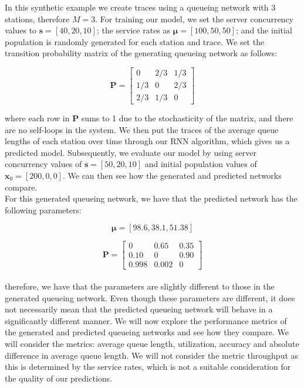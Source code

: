 \documentclass[a4paper,11pt,titlepage]{article}
\begin{document}
In this synthetic example we create traces using a queueing network with 3 stations, therefore $M=3$. For training our model, we set the server concurrency values to $\mathbf{s} = [40, 20, 10]$; the service rates as $\bm{\mu} = [100,50,50]$; and the initial population is randomly generated for each station and trace. We set the transition probability matrix of the generating queueing network as follows: 

\begin{equation}
    \mathbf{P} = \begin{bmatrix}
     0 & 2/3 & 1/3 \\
     1/3 & 0 & 2/3 \\
     2/3 & 1/3 & 0
    \end{bmatrix}
\end{equation}

where each row in $\mathbf{P}$ sums to 1 due to the stochasticity of the matrix, and there are no self-loops in the system. We then put the traces of the average queue lengths of each station over time through our RNN algorithm, which gives us a predicted model. Subsequently, we evaluate our model by using server concurrency values of $\mathbf{s} = [50, 20,  10]$ and initial population values of $ \mathbf{x}_0 = [200,0,0]$. We can then see how the generated and predicted networks compare. \\

For this generated queueing network, we have that the predicted network has the following parameters: 

$$ \bm{\mu} = [98.6, 38.1, 51.38] $$

$$\mathbf{P} = \begin{bmatrix}
0 & 0.65 & 0.35\\
0.10 & 0 & 0.90\\
0.998 & 0.002 & 0
\end{bmatrix} $$ \\

therefore, we have that the parameters are slightly different to those in the generated queueing network. Even though these parameters are different, it does not necessarily mean that the predicted queueing network will behave in a significantly different manner. We will now explore the performance metrics of the generated and predicted queueing networks and see how they compare. We will consider the metrics: average queue length, utilization, accuracy and absolute difference in average queue length. We will not consider the metric throughput as this is determined by the service rates, which is not a suitable consideration for the quality of our predictions. \\
\end{document}
